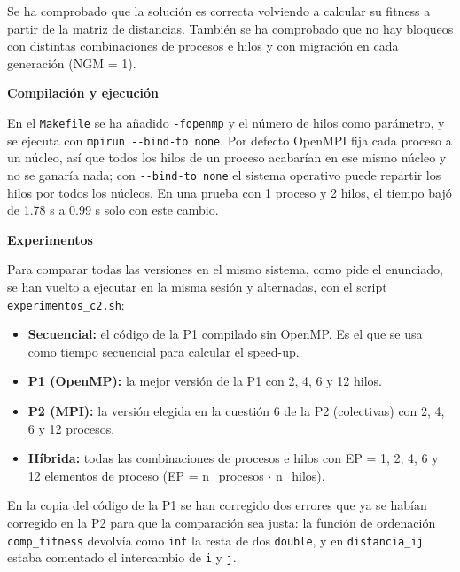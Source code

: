 \documentclass[12pt]{article}
\begin{document}
\begin{enumerate}
Se ha comprobado que la solución es correcta volviendo a calcular su fitness a partir de la matriz de distancias. También se ha comprobado que no hay bloqueos con distintas combinaciones de procesos e hilos y con migración en cada generación (NGM = 1).

\vspace{0.5cm}

\medskip
\noindent\textbf{Compilación y ejecución}\par
\smallskip

En el \texttt{Makefile} se ha añadido \texttt{-fopenmp} y el número de hilos como parámetro, y se ejecuta con \texttt{mpirun -{}-bind-to none}. Por defecto OpenMPI fija cada proceso a un núcleo, así que todos los hilos de un proceso acabarían en ese mismo núcleo y no se ganaría nada; con \texttt{-{}-bind-to none} el sistema operativo puede repartir los hilos por todos los núcleos. En una prueba con 1 proceso y 2 hilos, el tiempo bajó de 1.78 s a 0.99 s solo con este cambio.

\vspace{0.5cm}

\medskip
\noindent\textbf{Experimentos}\par
\smallskip

Para comparar todas las versiones en el mismo sistema, como pide el enunciado, se han vuelto a ejecutar en la misma sesión y alternadas, con el script \texttt{experimentos\_c2.sh}:

\begin{itemize}
    \item \textbf{Secuencial:} el código de la P1 compilado sin OpenMP. Es el que se usa como tiempo secuencial para calcular el speed-up.
    \item \textbf{P1 (OpenMP):} la mejor versión de la P1 con 2, 4, 6 y 12 hilos.
    \item \textbf{P2 (MPI):} la versión elegida en la cuestión 6 de la P2 (colectivas) con 2, 4, 6 y 12 procesos.
    \item \textbf{Híbrida:} todas las combinaciones de procesos e hilos con EP = 1, 2, 4, 6 y 12 elementos de proceso (EP = n\_procesos $\cdot$ n\_hilos).
\end{itemize}

En la copia del código de la P1 se han corregido dos errores que ya se habían corregido en la P2 para que la comparación sea justa: la función de ordenación \texttt{comp\_fitness} devolvía como \texttt{int} la resta de dos \texttt{double}, y en \texttt{distancia\_ij} estaba comentado el intercambio de \texttt{i} y \texttt{j}.


\end{enumerate}
\end{document}
